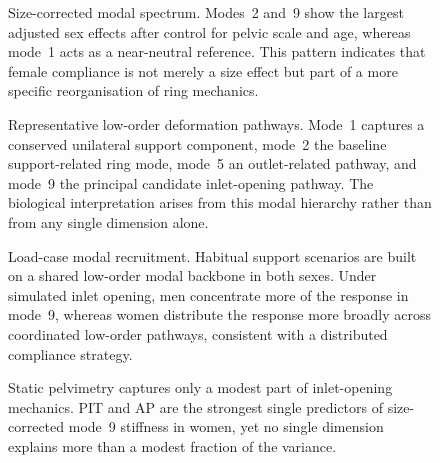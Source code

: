 \documentclass[openacc]{rsproca_new}
\begin{document}
\begin{figure}[p]
\centering
{}
\caption{Size-corrected modal spectrum. Modes~2 and~9 show the largest adjusted sex effects after control for pelvic scale and age, whereas mode~1 acts as a near-neutral reference. This pattern indicates that female compliance is not merely a size effect but part of a more specific reorganisation of ring mechanics.}
\label{fig:eigs}
\end{figure}

\begin{figure}[p]
\centering
{}
\caption{Representative low-order deformation pathways. Mode~1 captures a conserved unilateral support component, mode~2 the baseline support-related ring mode, mode~5 an outlet-related pathway, and mode~9 the principal candidate inlet-opening pathway. The biological interpretation arises from this modal hierarchy rather than from any single dimension alone.}
\label{fig:modeshapes}
\end{figure}

\begin{figure}[p]
\centering
{}
\caption{Load-case modal recruitment. Habitual support scenarios are built on a shared low-order modal backbone in both sexes. Under simulated inlet opening, men concentrate more of the response in mode~9, whereas women distribute the response more broadly across coordinated low-order pathways, consistent with a distributed compliance strategy.}
\label{fig:recruitment}
\end{figure}

\begin{figure}[p]
\centering
{}
\caption{Static pelvimetry captures only a modest part of inlet-opening mechanics. PIT and AP are the strongest single predictors of size-corrected mode~9 stiffness in women, yet no single dimension explains more than a modest fraction of the variance.}
\label{fig:pelvimetry}
\end{figure}
\end{document}
